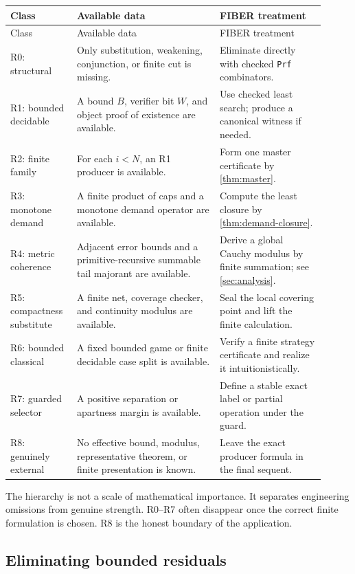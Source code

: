\begin{longtable}{p{0.18\linewidth}p{0.42\linewidth}p{0.31\linewidth}}
\toprule
Class & Available data & FIBER treatment\\
\midrule
\endfirsthead
\toprule
Class & Available data & FIBER treatment\\
\midrule
\endhead
R0: structural & Only substitution, weakening, conjunction, or finite cut is missing. & Eliminate directly with checked \texttt{Prf} combinators.\\
R1: bounded decidable & A bound \(B\), verifier bit \(W\), and object proof of existence are available. & Use checked least search; produce a canonical witness if needed.\\
R2: finite family & For each \(i<N\), an R1 producer is available. & Form one master certificate by \cref{thm:master}.\\
R3: monotone demand & A finite product of caps and a monotone demand operator are available. & Compute the least closure by \cref{thm:demand-closure}.\\
R4: metric coherence & Adjacent error bounds and a primitive-recursive summable tail majorant are available. & Derive a global Cauchy modulus by finite summation; see \cref{sec:analysis}.\\
R5: compactness substitute & A finite net, coverage checker, and continuity modulus are available. & Seal the local covering point and lift the finite calculation.\\
R6: bounded classical & A fixed bounded game or finite decidable case split is available. & Verify a finite strategy certificate and realize it intuitionistically.\\
R7: guarded selector & A positive separation or apartness margin is available. & Define a stable exact label or partial operation under the guard.\\
R8: genuinely external & No effective bound, modulus, representative theorem, or finite presentation is known. & Leave the exact producer formula in the final sequent.\\
\bottomrule
\end{longtable}

The hierarchy is not a scale of mathematical importance.  It separates
engineering omissions from genuine strength.  R0--R7 often disappear once the
correct finite formulation is chosen.  R8 is the honest boundary of the
application.

\subsection{Eliminating bounded residuals}

